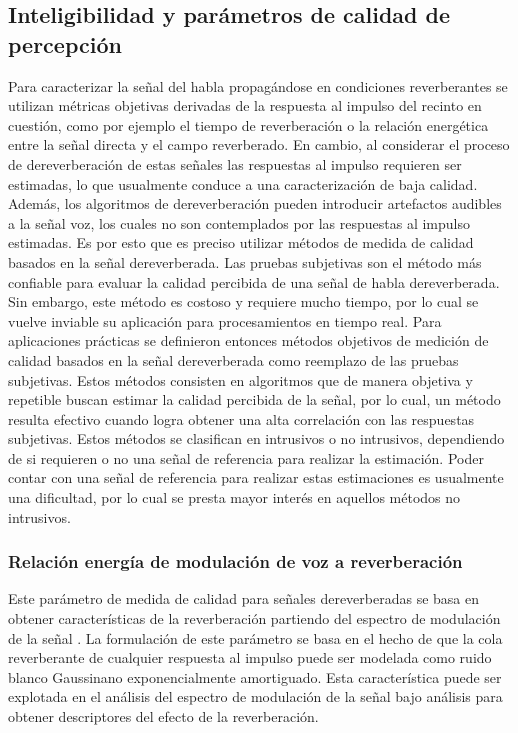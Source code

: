 \subsection{Inteligibilidad y parámetros de calidad de percepción}

Para caracterizar la señal del habla propagándose en condiciones reverberantes se utilizan métricas objetivas derivadas de la respuesta al impulso del recinto en cuestión, como por ejemplo el tiempo de reverberación o la relación energética entre la señal directa y el campo reverberado. En cambio, al considerar el proceso de dereverberación de estas señales las respuestas al impulso requieren ser estimadas, lo que usualmente conduce a una caracterización de baja calidad. Además, los algoritmos de dereverberación pueden introducir artefactos audibles a la señal voz, los cuales no son contemplados por las respuestas al impulso estimadas. Es por esto que es preciso utilizar métodos de medida de calidad basados en la señal dereverberada. Las pruebas subjetivas son el método más confiable para evaluar la calidad percibida de una señal de habla dereverberada. Sin embargo, este método es costoso y requiere mucho tiempo, por lo cual se vuelve inviable su aplicación para procesamientos en tiempo real. Para aplicaciones prácticas se definieron entonces métodos objetivos de medición de calidad basados en la señal dereverberada como reemplazo de las pruebas subjetivas. Estos métodos consisten en algoritmos que de manera objetiva y repetible buscan estimar la calidad percibida de la señal, por lo cual, un método resulta efectivo cuando logra obtener una alta correlación con las respuestas subjetivas. Estos métodos se clasifican en intrusivos o no intrusivos, dependiendo de si requieren o no una señal de referencia para realizar la estimación. Poder contar con una señal de referencia para realizar estas estimaciones es usualmente una dificultad, por lo cual se presta mayor interés en aquellos métodos no intrusivos. 

\subsubsection{Relación energía de modulación de voz a reverberación}

Este parámetro de medida de calidad para señales dereverberadas se basa en obtener características de la reverberación partiendo del espectro de modulación de la señal \cite{SRMR}. La formulación de este parámetro se basa en el hecho de que la cola reverberante de cualquier respuesta al impulso puede ser modelada como ruido blanco Gaussinano exponencialmente amortiguado. Esta característica puede ser explotada en el análisis del espectro de modulación de la señal bajo análisis para obtener descriptores del efecto de la reverberación.

